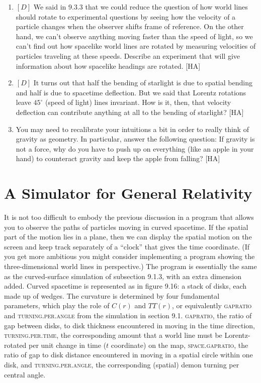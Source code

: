 \documentclass{book}
\begin{document}
\begin{enumerate}
\item $[D]$ We said in 9.3.3 that we could reduce the question of how world
lines should rotate to experimental questions by seeing how the velocity
of a particle changes when the observer shifts frame of reference. On
the other hand, we can't observe anything moving faster than the speed
of light, so we can't find out how spacelike world lines are rotated by
measuring velocities of particles traveling at these speeds. Describe an
experiment that will give information about how spacelike headings are
rotated. [HA]

\item $[D]$ It turns out that half the bending of starlight is due to spatial
bending and half is due to spacetime deflection. But we said that Lorentz
rotations leave $45^{\circ}$ (speed of light) lines invariant. How is it, then,
that velocity deflection can contribute anything at all to the bending
of starlight? [HA]

\item You may need to recalibrate your intuitions a bit in order to really
think of gravity as geometry. In particular, answer the following question: If gravity is not a force, why do you have to push up on everything
(like an apple in your hand) to counteract gravity and keep the apple
from falling? [HA]
\end{enumerate}

\section{A Simulator for General Relativity}

It is not too difficult to embody the previous discussion in a program that
allows you to observe the paths of particles moving in curved spacetime.
If the spatial part of the motion lies in a plane, then we can display the
spatial motion on the screen and keep track separately of a ``clock'' that
gives the time coordinate. (If you get more ambitious you might consider
implementing a program showing the three-dimensional world lines in
perspective.) The program is essentially the same as the curved-surface
simulation of subsection 9.1.3, with an extra dimension added. Curved
spacetime is represented as in figure 9.16: a stack of disks, each made up
of wedges. The curvature is determined by four fundamental parameters,
which play the role of $C(r)$ and $TT(r)$, or equivalently \textsc{gapratio} and
\textsc{turning}\textsc{.per}\textsc{.angle} from the simulation in section 9.1. \textsc{gapratio}, the ratio of gap between disks, to disk thickness encountered in moving in the time direction,
\textsc{turning}\textsc{.per}\textsc{.time}, the corresponding amount that a world line must
be Lorentz-rotated per unit change in time ($t$ coordinate) on the map,
\textsc{space}\textsc{.gapratio}, the ratio of gap to disk distance encountered in moving
in a spatial circle within one disk, and
\textsc{turning}\textsc{.per}\textsc{.angle}, the corresponding (spatial) demon turning per central
angle.
\end{document}

